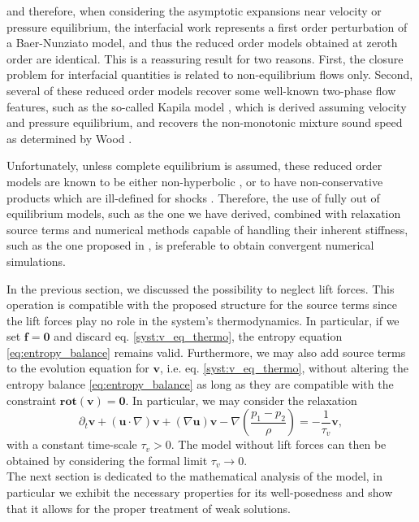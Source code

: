 \documentclass{myclass}
\newcommand{\vel}{\bm{u}}
\newcommand{\lift}{\bm{f}}
\newcommand{\pth}[1]  {\left( #1 \right)}
\newcommand{\rot}{\mathbf{rot}}
\begin{document}
and therefore, when considering the asymptotic expansions near velocity or pressure equilibrium, the interfacial work represents a first order perturbation of a Baer-Nunziato model, and thus the reduced order models obtained at zeroth order are identical. This is a reassuring result for two reasons. First, the closure problem for interfacial quantities is related to non-equilibrium flows only. Second, several of these reduced order models recover some well-known two-phase flow features, such as the so-called Kapila model \cite{kapila:2001}, which is derived assuming velocity and pressure equilibrium, and recovers the non-monotonic mixture sound speed as determined by Wood \cite{wood:1930}.

Unfortunately, unless complete equilibrium is assumed, these reduced order models are known to be either non-hyperbolic \cite{hantke:2021}, or to have non-conservative products which are ill-defined for shocks \cite{kapila:2001}. Therefore, the use of fully out of equilibrium models, such as the one we have derived, combined with relaxation source terms and numerical methods capable of handling their inherent stiffness, such as the one proposed in \cite{herard:2023}, is preferable to obtain convergent numerical simulations. 


In the previous section, we discussed the possibility to neglect lift forces. This operation is compatible with the proposed structure for the source terms since the lift forces play no role in the system's thermodynamics. In particular, if we set $\lift=\bm{0}$ and discard eq. \eqref{syst:v_eq_thermo}, the entropy equation \eqref{eq:entropy_balance} remains valid. Furthermore, we may also add source terms to the evolution equation for $\bm{v}$, i.e. eq. \eqref{syst:v_eq_thermo}, without altering the entropy balance \eqref{eq:entropy_balance} as long as they are compatible with the constraint $\rot(\bm{v})=\bm{0}$. In particular, we may consider the relaxation
\begin{equation}
\partial_t \bm{v} + \pth{\vel\cdot\nabla}\bm{v} + \pth{\nabla\vel}\bm{v} - \nabla\pth{\frac{p_1-p_2}{\rho}} = -\frac{1}{\tau_v}\bm{v},
\end{equation}
with a constant time-scale $\tau_v>0$. The model without lift forces can then be obtained by considering the formal limit $\tau_v\to0$.\\

The next section is dedicated to the mathematical analysis of the model, in particular we exhibit the necessary properties for its well-posedness and show that it allows for the proper treatment of weak solutions.
\end{document}
